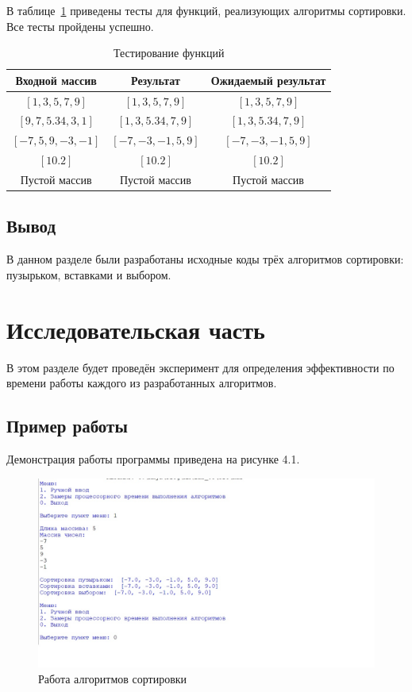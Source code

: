 \documentclass[12pt]{report}
\begin{document}
	В таблице~\ref{tbl:test} приведены тесты для функций, реализующих алгоритмы сортировки. Все тесты пройдены успешно.
	
	\begin{table}[h!]
		\begin{center}
			\caption{\label{tbl:test}Тестирование функций}
			\begin{tabular}{|c|c|c|}
				\hline
				Входной массив & Результат & Ожидаемый результат \\ 
				\hline
				$[1, 3, 5, 7, 9]$ & $[1, 3, 5, 7, 9]$  & $[1, 3, 5, 7, 9]$\\\hline
				$[9, 7, 5.34, 3, 1]$  & $[1, 3, 5.34, 7, 9]$ & $[1, 3, 5.34, 7, 9]$\\\hline
				$[-7, 5, 9, -3, -1]$  & $[-7, -3, -1, 5, 9]$  & $[-7, -3, -1, 5, 9]$\\\hline
				$[10.2]$  & $[10.2]$  & $[10.2]$\\\hline
				Пустой массив  & Пустой массив  & Пустой массив\\
				\hline
			\end{tabular}
		\end{center}
	\end{table}
	
	\section{Вывод}
	В данном разделе были разработаны исходные коды трёх алгоритмов сортировки: пузырьком, вставками и выбором.
	
	\chapter{Исследовательская часть}
	
	В этом разделе будет проведён эксперимент для определения эффективности по времени работы каждого из разработанных алгоритмов.
	
	\section{Пример работы}
	
	Демонстрация работы программы приведена на рисунке 4.1.
	
	\begin{figure}[h]
		\begin{center}
			\includegraphics[scale=1]{example.jpg}
			\caption{Работа алгоритмов сортировки}
		\end{center}
	\end{figure}
\end{document}
